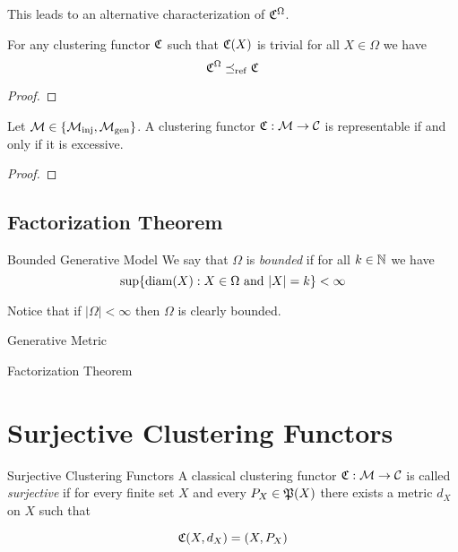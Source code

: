 This leads to an alternative characterization of $\Cf^\Omega$.

\begin{proposition}{}{}
For any clustering functor $\Cf$ such that $\Cf(X)$ is trivial for all $X \in \Omega$ we have
$$
\Cf^\Omega \refines \Cf
$$
\end{proposition}

\begin{proof}
\newresult[]
\end{proof}

\begin{theorem}{}{}
Let $\M \in \{\inj, \gen\}$. A clustering functor $\Cf: \M \to \C$ is representable if and only if it is excessive.
\end{theorem}

\begin{proof}
\todo
\end{proof}

\subsection{Factorization Theorem}

\begin{definition}{Bounded Generative Model}{}
We say that $\Omega$ is \emph{bounded} if for all $k \in \N$ we have
$$
\sup\{\diam(X): X \in \Omega \text{ and } |X| = k\} < \infty
$$
\end{definition}
Notice that if $|\Omega| < \infty$ then $\Omega$ is clearly bounded.

\begin{definition}{Generative Metric}{}
\end{definition}

\begin{theorem}{}{}
    Factorization Theorem
\end{theorem}

\section{Surjective Clustering Functors}

\begin{definition}{Surjective Clustering Functors}{}
    A classical clustering functor $\Cf: \M \to \C$ is called \emph{surjective} if for every finite set $X$ and every $P_X \in \P(X)$ there exists a metric $d_X$ on $X$ such that

    \begin{equation*}
        \Cf(X,d_X) = (X,P_X)
    \end{equation*}

\end{definition}

